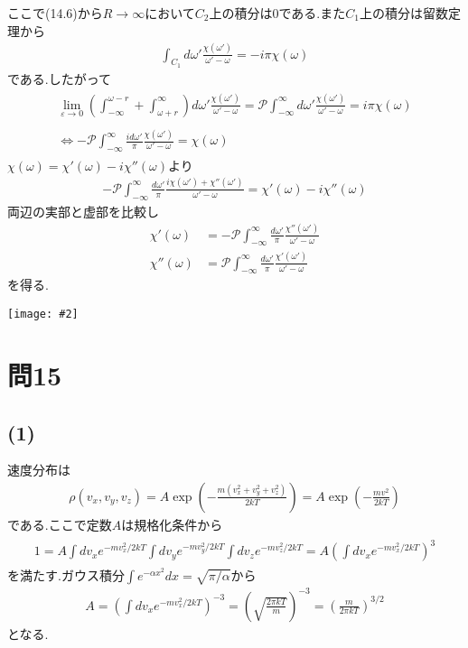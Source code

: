 \documentclass[uplatex,a4j,11pt,dvipdfmx]{jsarticle}
\makeatletter
\def\fgcaption{\def\@captype{figure}\caption}
\newcommand{\mfig}[3][width=15cm]{
\begin{center}
\texttt{[image: \#2]}
\fgcaption{#3 \label{fig:#2}}
\end{center}
}
\makeatother
\begin{document}
ここで(14.6)から$R\rightarrow\infty$において$C_2$上の積分は$0$である.また$C_1$上の積分は留数定理から
\begin{align}
  \int_{C_1}d\omega'\frac{\chi(\omega')}{\omega'-\omega}=-i\pi\chi(\omega)
\end{align}
である.したがって
\begin{align}
  \begin{split}
    \lim_{\varepsilon\rightarrow0}\left(\int_{-\infty}^{\omega-r}+\int_{\omega+r}^{\infty}\right)d\omega'\frac{\chi(\omega')}{\omega'-\omega}=
    \mathcal{P}\int_{-\infty}^\infty d\omega'\frac{\chi(\omega')}{\omega'-\omega}=i\pi\chi(\omega)
  \end{split}\nonumber\\
  \begin{split}
    \iff -\mathcal{P}\int_{-\infty}^\infty \frac{id\omega'}{\pi}\frac{\chi(\omega')}{\omega'-\omega}=\chi(\omega)
  \end{split}
\end{align}
$\chi(\omega)=\chi'(\omega)-i\chi''(\omega)$より
\begin{align}
  -\mathcal{P}\int_{-\infty}^{\infty}\frac{d\omega'}{\pi}\frac{i\chi(\omega')+\chi''(\omega')}{\omega'-\omega}=\chi'(\omega)-i\chi''(\omega)
\end{align}
両辺の実部と虚部を比較し
\begin{align}
  \chi'(\omega)&=-\mathcal{P}\int_{-\infty}^{\infty}\frac{d\omega'}{\pi}\frac{\chi''(\omega')}{\omega'-\omega}\\
  \chi''(\omega)&=\mathcal{P}\int_{-\infty}^{\infty}\frac{d\omega'}{\pi}\frac{\chi'(\omega')}{\omega'-\omega}
\end{align}
を得る.
\mfig[width=8cm]{14.jpg}{積分経路}
\section*{問15}
\subsection*{(1)}
\setcounter{section}{15}
\setcounter{equation}{0}
速度分布は
\begin{align}
  \rho(v_x,v_y,v_z)=A\exp\left(-\frac{m(v_x^2+v_y^2+v_z^2)}{2kT}\right)=A\exp\left(-\frac{mv^2}{2kT}\right)
\end{align}
である.ここで定数$A$は規格化条件から
\begin{align}
  \begin{split}
    1=A\int dv_x e^{-mv_x^2/2kT}\int dv_y e^{-mv_y^2/2kT}\int dv_z e^{-mv_z^2/2kT}=A\left(\int dv_x e^{-mv_x^2/2kT}\right)^3
  \end{split}
\end{align}
を満たす.ガウス積分$\int e^{-\alpha x^2}dx=\sqrt{\pi/\alpha}$から
\begin{align}
  A=\left(\int dv_x e^{-mv_x^2/2kT}\right)^{-3}=\left(\sqrt{\frac{2\pi kT}{m}}\right)^{-3}=\left(\frac{m}{2\pi kT}\right)^{3/2}
\end{align}
となる.
\end{document}
